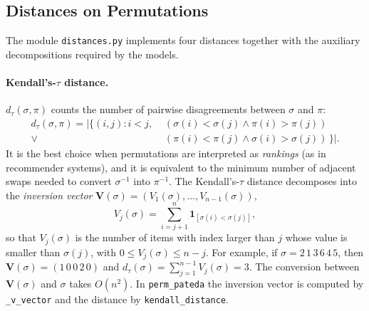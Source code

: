 \documentclass[a4paper,11pt]{article}
\begin{document}
\subsection{Distances on Permutations}

The module \texttt{distances.py} implements four distances together with the
auxiliary decompositions required by the models.

\paragraph{Kendall's-$\tau$ distance.}
$d_\tau(\sigma,\pi)$ counts the number of pairwise disagreements between
$\sigma$ and $\pi$:
\begin{align*}
d_\tau(\sigma, \pi)=|\{(i,j) : i<j,\,\, & (\sigma(i) < \sigma(j) \land \pi(i)>\pi(j) ) \\
 \lor & (\pi(i) < \pi(j) \land \sigma(i)>\sigma(j) )  \, \}| .
\end{align*}
It is the best choice when permutations are interpreted as \emph{rankings} (as in
recommender systems), and it is equivalent to the minimum number of adjacent
swaps needed to convert $\sigma^{-1}$ into $\pi^{-1}$.  The Kendall's-$\tau$
distance decomposes into the \emph{inversion vector}
$\mathbf{V}(\sigma) = (V_1(\sigma),\ldots,V_{n-1}(\sigma))$,
\begin{equation}
 V_j(\sigma) = \sum_{i=j+1}^n \bm{1}_{[\sigma(i) < \sigma(j)]} ,
 \label{eq:kendall_decomp}
\end{equation}
so that $V_j(\sigma)$ is the number of items with index larger than $j$ whose
value is smaller than $\sigma(j)$, with $0 \leq V_j(\sigma) \leq n-j$.  For
example, if $\sigma = 2\,1\,3\,6\,4\,5$, then $\mathbf{V}(\sigma) = (1\,0\,0\,2\,0)$
and $d_\tau(\sigma) = \sum_{j=1}^{n-1} V_j(\sigma) = 3$.  The conversion between
$\mathbf{V}(\sigma)$ and $\sigma$ takes $O(n^2)$.  In \texttt{perm\_pateda} the
inversion vector is computed by \texttt{\_v\_vector} and the distance by
\texttt{kendall\_distance}.
\end{document}
